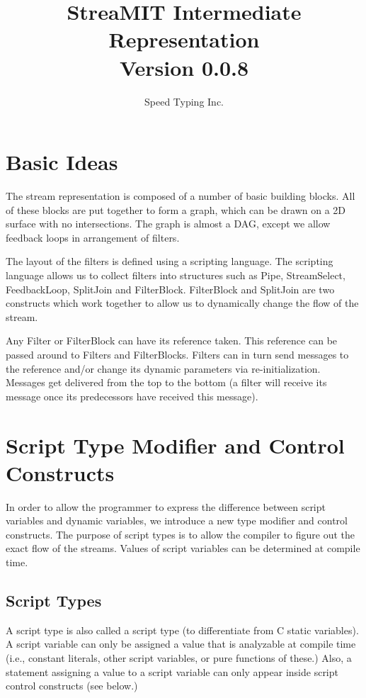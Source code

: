 \documentclass[draft]{article}
\title{StreaMIT Intermediate Representation \\ Version 0.0.8}
\author{Speed Typing Inc.}
\begin{document}
\maketitle

\section{Basic Ideas}

The stream representation is composed of a number of basic building blocks.
All of these blocks are put together to form a graph, which can be drawn
on a 2D surface with no intersections.  The graph is almost a DAG, except
we allow feedback loops in arrangement of filters.

The layout of the filters is defined using a scripting language.  The scripting
language allows us to collect filters into structures such as Pipe,
StreamSelect, FeedbackLoop, SplitJoin and FilterBlock.  FilterBlock and 
SplitJoin are two constructs which work together to allow us to dynamically
change the flow of the stream.

Any Filter or FilterBlock can have its reference taken.  This
reference can be passed around to Filters and FilterBlocks.  Filters
can in turn send messages to the reference and/or change its dynamic
parameters via re-initialization.  Messages get delivered from the top
to the bottom (a filter will receive its message once its predecessors
have received this message).

\section{Script Type Modifier and Control Constructs}

In order to allow the programmer to express the difference between
script variables and dynamic variables, we introduce a new type modifier
and control constructs.  The purpose of script types is to allow the compiler
to figure out the exact flow of the streams.  Values of script variables
can be determined at compile time.

\subsection{Script Types}

A script type is also called a script type (to differentiate from C
static variables).  A script variable can only be assigned a value
that is analyzable at compile time (i.e., constant literals, other
script variables, or pure functions of these.)  Also, a statement
assigning a value to a script variable can only appear inside script
control constructs (see below.)
\end{document}
